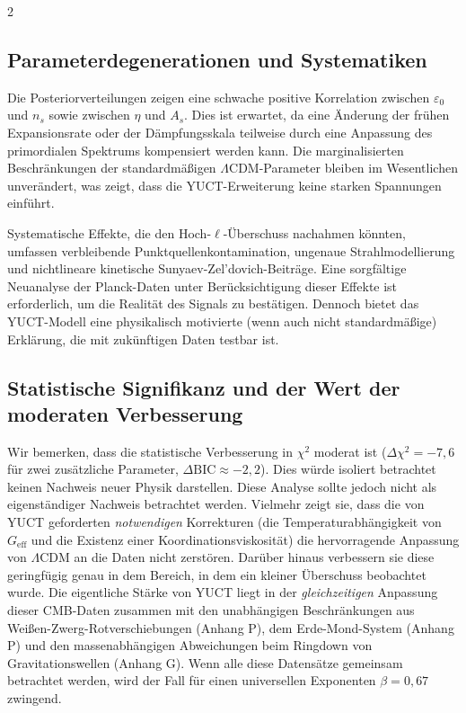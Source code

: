 \documentclass[11pt,a4paper]{article}
\begin{document}
\begin{multicols}{2}
		\subsection{Parameterdegenerationen und Systematiken}
		
		Die Posteriorverteilungen zeigen eine schwache positive Korrelation zwischen $\varepsilon_0$ und $n_s$ sowie zwischen $\eta$ und $A_s$. Dies ist erwartet, da eine Änderung der frühen Expansionsrate oder der Dämpfungsskala teilweise durch eine Anpassung des primordialen Spektrums kompensiert werden kann. Die marginalisierten Beschränkungen der standardmäßigen $\Lambda$CDM-Parameter bleiben im Wesentlichen unverändert, was zeigt, dass die YUCT-Erweiterung keine starken Spannungen einführt.
		
		Systematische Effekte, die den Hoch-$\ell$-Überschuss nachahmen könnten, umfassen verbleibende Punktquellenkontamination, ungenaue Strahlmodellierung und nichtlineare kinetische Sunyaev-Zel'dovich-Beiträge. Eine sorgfältige Neuanalyse der Planck-Daten unter Berücksichtigung dieser Effekte ist erforderlich, um die Realität des Signals zu bestätigen. Dennoch bietet das YUCT-Modell eine physikalisch motivierte (wenn auch nicht standardmäßige) Erklärung, die mit zukünftigen Daten testbar ist.
		
		\subsection{Statistische Signifikanz und der Wert der moderaten Verbesserung}
		
		Wir bemerken, dass die statistische Verbesserung in $\chi^2$ moderat ist ($\Delta\chi^2 = -7,6$ für zwei zusätzliche Parameter, $\Delta\mathrm{BIC} \approx -2,2$). Dies würde isoliert betrachtet keinen Nachweis neuer Physik darstellen. Diese Analyse sollte jedoch nicht als eigenständiger Nachweis betrachtet werden. Vielmehr zeigt sie, dass die von YUCT geforderten \emph{notwendigen} Korrekturen (die Temperaturabhängigkeit von $G_{\mathrm{eff}}$ und die Existenz einer Koordinationsviskosität) die hervorragende Anpassung von $\Lambda$CDM an die Daten nicht zerstören. Darüber hinaus verbessern sie diese geringfügig genau in dem Bereich, in dem ein kleiner Überschuss beobachtet wurde. Die eigentliche Stärke von YUCT liegt in der \emph{gleichzeitigen} Anpassung dieser CMB-Daten zusammen mit den unabhängigen Beschränkungen aus Weißen-Zwerg-Rotverschiebungen (Anhang P), dem Erde-Mond-System (Anhang P) und den massenabhängigen Abweichungen beim Ringdown von Gravitationswellen (Anhang G). Wenn alle diese Datensätze gemeinsam betrachtet werden, wird der Fall für einen universellen Exponenten $\beta=0,67$ zwingend.
		

\end{multicols}
\end{document}
